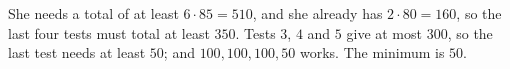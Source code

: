 She needs a total of at least $6\cdot85=510$, and she already has $2\cdot80=160$, so the last four tests must total at least $350$. Tests $3$, $4$ and $5$ give at most $300$, so the last test needs at least $50$; and $100,100,100,50$ works. The minimum is $\boxed{50}$.

